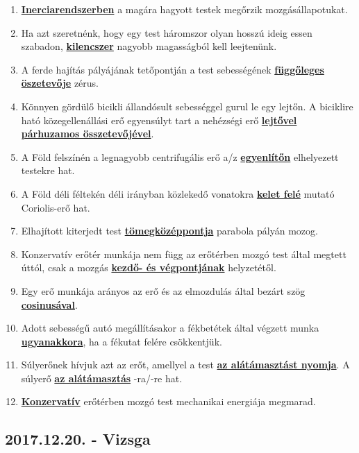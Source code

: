 \documentclass[../../fizika_kerdesek.tex]{subfiles}
\begin{document}
        \begin{enumerate}
            \item \underline{\textbf{Inerciarendszerben}} a magára hagyott testek megőrzik mozgásállapotukat. 
            \item Ha azt szeretnénk, hogy egy test háromszor olyan hosszú ideig essen szabadon, \underline{\textbf{kilencszer}} nagyobb magasságból kell leejtenünk.
            \item A ferde hajítás pályájának tetőpontján a test sebességének \underline{\textbf{függőleges öszetevője}} zérus.
            \item Könnyen gördülő bicikli állandósult sebességgel gurul le egy lejtőn. A biciklire ható közegellenállási erő egyensúlyt tart a nehézségi erő \underline{\textbf{lejtővel párhuzamos összetevőjével}}.
            \item A Föld felszínén a legnagyobb centrifugális erő a/z \underline{\textbf{egyenlítőn}} elhelyezett testekre hat.
            \item A Föld déli féltekén déli irányban közlekedő vonatokra \underline{\textbf{kelet felé}} mutató Coriolis-erő hat.
            \item Elhajított kiterjedt test \underline{\textbf{tömegközéppontja}} parabola pályán mozog.
            \item Konzervatív erőtér munkája nem függ az erőtérben mozgó test által megtett úttól, csak a mozgás \underline{\textbf{kezdő- és végpontjának}} helyzetétől.
            \item Egy erő munkája arányos az erő és az elmozdulás által bezárt szög \underline{\textbf{cosinusával}}.
            \item Adott sebességű autó megállításakor a fékbetétek által végzett munka \underline{\textbf{ugyanakkora}}, ha a fékutat felére csökkentjük.
            \item Súlyerőnek hívjuk azt az erőt, amellyel a test \underline{\textbf{az alátámasztást nyomja}}. A súlyerő \underline{\textbf{az alátámasztás}} -ra/-re hat.
            \item \underline{\textbf{Konzervatív}} erőtérben mozgó test mechanikai energiája megmarad.
        \end{enumerate}

    \subsection{2017.12.20. - Vizsga}
\end{document}
